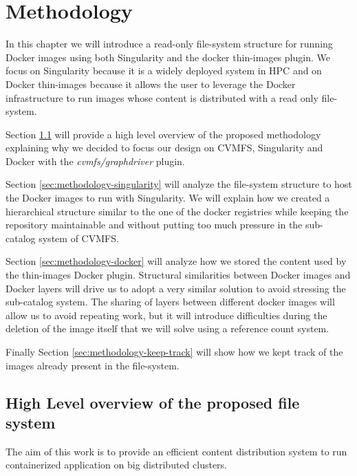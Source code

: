\chapter{Methodology}\label{ch:Methodology}

In this chapter we will introduce a read-only file-system structure for
running Docker images using both Singularity and the docker thin-images plugin.
We focus on Singularity because it is a widely deployed system in HPC and on
Docker thin-images because it allows the user to leverage the Docker infrastructure
to run images whose content is distributed with a read only file-system.

Section \ref{sec:methodology-high-level} will provide a high level overview of
the proposed methodology explaining why we decided to focus our design on CVMFS,
Singularity and Docker with the \textit{cvmfs/graphdriver} plugin.

Section \ref{sec:methodology-singularity} will analyze the file-system
structure to host the Docker images to run with Singularity. We will explain
how we created a hierarchical structure similar to the one of the docker
registries while keeping the repository maintainable and without putting too
much pressure in the sub-catalog system of CVMFS.

Section \ref{sec:methodology-docker} will analyze how we stored the content used
by the thin-images Docker plugin. Structural similarities between Docker images
and Docker layers will drive us to adopt a very similar solution to avoid
stressing the sub-catalog system. The sharing of layers between different
docker images will allow us to avoid repeating work, but it will introduce
difficulties during the deletion of the image itself that we will solve using a
reference count system.

Finally Section \ref{sec:methodology-keep-track} will show how we kept
track of the images already present in the file-system.

\section{High Level overview of the proposed file system}
\label{sec:methodology-high-level}

The aim of this work is to provide an efficient content distribution
system to run containerized application on big distributed clusters.  

